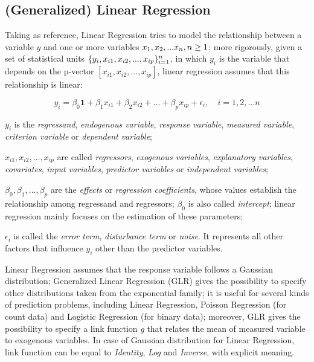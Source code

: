 \subsection{(Generalized) Linear Regression}\label{glr}

Taking \cite{site:caltechML2012} as reference, Linear Regression tries to model the relationship between a variable $y$ and one or more variables $x_1,x_2,\\...x_n,n\ge1$; more rigorously, given a set of statistical units $\{y_i,x_{i1},x_{i2},\\...,x_{ip}\}_{i = 1}^n$, in which $y_i$ is the variable that depends on the p-vector $[x_{i1}, x_{i2}, ..., x_{ip}]$, linear regression assumes that this relationship is linear:

\begin{equation}
    y_i = \beta_0\boldsymbol{1} + \beta_1x_{i1} + \beta_2x_{i2} + ... +  \beta_px_{ip} + \epsilon_i, \quad i = 1, 2, ... n
\end{equation}

$y_i$ is the \textit{regressand}, \textit{endogenous variable}, \textit{response variable}, \textit{measured variable}, \textit{criterion variable} or \textit{dependent variable};

$x_{i1}, x_{i2}, ..., x_{ip}$ are called \textit{regressors}, \textit{exogenous variables}, \textit{explanatory variables}, \textit{covariates}, \textit{input variables}, \textit{predictor variables} or \textit{independent variables};

$\beta_0, \beta_1, ..., \beta_p$ are the \textit{effects} or \textit{regression coefficients}, whose values establish the relationship among regressand and regressors; $\beta_0$ is also called \textit{intercept}; linear regression mainly focuses on the estimation of these parameters;

$\epsilon_i$ is called the \textit{error term}, \textit{disturbance term} or \textit{noise}. It represents all other factors that influence $y_i$ other than the predictor variables.

Linear Regression assumes that the response variable follows a Gaussian distribution; Generalized Linear Regression (GLR) gives the possibility to specify other distributions taken from the exponential family; it is useful for several kinds of prediction problems, including Linear Regression, Poisson Regression (for count data) and Logistic Regression (for binary data); moreover, GLR gives the possibility to specify a link function \textit{g} that relates the mean of measured variable to exogenous variables. In case of Gaussian distribution for Linear Regression, link function can be equal to \textit{Identity}, \textit{Log} and \textit{Inverse}, with explicit meaning.


